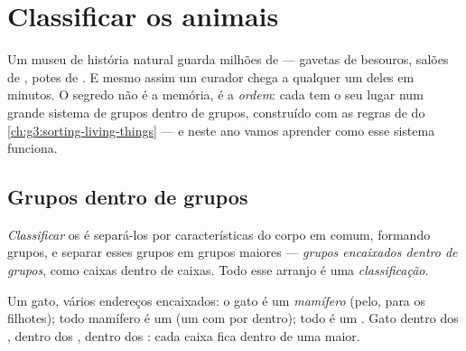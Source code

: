 \chapter{Classificar os animais}\label{ch:g4:classifying-animals}

Um museu de história natural guarda milhões de  --- gavetas
de besouros, salões de , potes de . E mesmo assim um
curador chega a qualquer um deles em minutos. O segredo não é a
memória, é a \emph{ordem}: cada  tem o seu lugar num grande
sistema de grupos dentro de grupos, construído com as regras de
 do \cref{ch:g3:sorting-living-things} --- e neste ano
vamos aprender como esse sistema funciona.

\section{Grupos dentro de grupos}

\begin{definition}[Classificação]\label{def:g4:classifying-animals:classification}
\emph{Classificar} os  é separá-los
por características do corpo em comum, formando grupos, e separar
esses grupos em grupos maiores --- \emph{grupos encaixados dentro de
grupos}, como caixas dentro de caixas. Todo
esse arranjo é uma \emph{classificação}.
\end{definition}

\begin{example}\label{ex:g4:classifying-animals:cat}
Um gato, vários endereços encaixados: o gato é um \emph{mamífero}
(pelo,  para os filhotes); todo mamífero é um
\emph{} (um  com  por dentro);
todo  é um \emph{}. Gato dentro dos ,
 dentro dos ,  dentro dos :
cada caixa fica dentro de uma maior.
\end{example}

